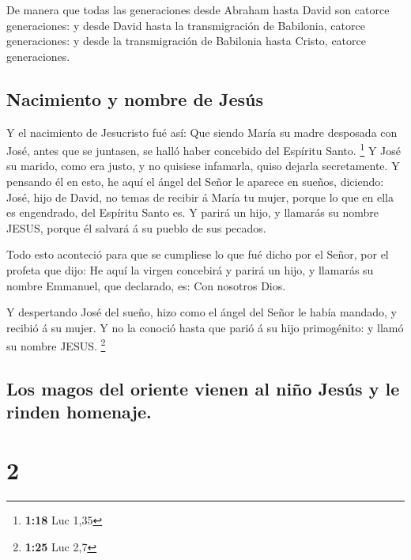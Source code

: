  De manera que todas las generaciones desde Abraham hasta
David son catorce generaciones: y desde David hasta la transmigración de
Babilonia, catorce generaciones: y desde la transmigración de Babilonia
hasta Cristo, catorce generaciones.

\hypertarget{nacimiento-y-nombre-de-jesuxfas}{%
\subsection{Nacimiento y nombre de
Jesús}\label{nacimiento-y-nombre-de-jesuxfas}}

 Y el nacimiento de Jesucristo fué así: Que siendo María
su madre desposada con José, antes que se juntasen, se halló haber
concebido del Espíritu Santo. \footnote{\textbf{1:18} Luc 1,35}
 Y José su marido, como era justo, y no quisiese
infamarla, quiso dejarla secretamente.  Y pensando él en
esto, he aquí el ángel del Señor le aparece en sueños, diciendo: José,
hijo de David, no temas de recibir á María tu mujer, porque lo que en
ella es engendrado, del Espíritu Santo es.  Y parirá un
hijo, y llamarás su nombre JESUS, porque él salvará á su pueblo de sus
pecados.

 Todo esto aconteció para que se cumpliese lo que fué
dicho por el Señor, por el profeta que dijo:  He aquí la
virgen concebirá y parirá un hijo, y llamarás su nombre Emmanuel, que
declarado, es: Con nosotros Dios.

 Y despertando José del sueño, hizo como el ángel del
Señor le había mandado, y recibió á su mujer.  Y no la
conoció hasta que parió á su hijo primogénito: y llamó su nombre JESUS.
\footnote{\textbf{1:25} Luc 2,7}

\hypertarget{los-magos-del-oriente-vienen-al-niuxf1o-jesuxfas-y-le-rinden-homenaje.}{%
\subsection{Los magos del oriente vienen al niño Jesús y le rinden
homenaje.}\label{los-magos-del-oriente-vienen-al-niuxf1o-jesuxfas-y-le-rinden-homenaje.}}

\hypertarget{section-1}{%
\section{2}\label{section-1}}

